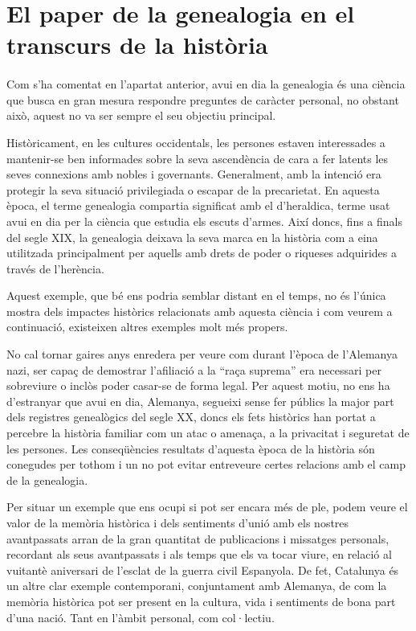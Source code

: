 \section{El paper de la genealogia en el transcurs de la història}

    \paragraph{}
    Com s’ha comentat en l'apartat anterior, avui en dia la genealogia és una ciència que busca en gran mesura respondre preguntes de caràcter personal, no obstant això, aquest no va ser sempre el seu objectiu principal.

    Històricament, en les cultures occidentals, les persones estaven interessades a mantenir-se ben informades sobre la seva ascendència de cara a fer latents les seves connexions amb nobles i governants. Generalment, amb la intenció era protegir la seva situació privilegiada o escapar de la precarietat. En aquesta època, el terme genealogia compartia significat amb el d'\gls{heraldica}, terme usat avui en dia per la ciència que estudia els escuts d’armes. Així doncs, fins a finals del segle XIX, la genealogia deixava la seva marca en la història com a eina utilitzada principalment per aquells amb drets de poder o riqueses adquirides a través de l’herència.

    Aquest exemple, que bé ens podria semblar distant en el temps, no és l’única mostra dels impactes històrics relacionats amb aquesta ciència i com veurem a continuació, existeixen altres exemples molt més propers.

    No cal tornar gaires anys enredera per veure com durant l’època de l’Alemanya nazi, ser capaç de demostrar l’afiliació a la ``raça suprema'' era necessari per sobreviure o inclòs poder casar-se de forma legal. Per aquest motiu, no ens ha d’estranyar que avui en dia, Alemanya, segueixi sense fer públics la major part dels registres genealògics del segle XX, doncs els fets històrics han portat a percebre la història familiar com un atac o amenaça, a la privacitat i seguretat de les persones. Les conseqüències resultats d'aquesta època de la història són conegudes per tothom i un no pot evitar entreveure certes relacions amb el camp de la genealogia.

    Per situar un exemple que ens ocupi si pot ser encara més de ple, podem veure el valor de la memòria històrica i dels sentiments d’unió amb els nostres avantpassats arran de la gran quantitat de publicacions i missatges personals, recordant als seus avantpassats i als temps que els va tocar viure, en relació al vuitantè aniversari de l'esclat de la guerra civil Espanyola. De fet, Catalunya és un altre clar exemple contemporani, conjuntament amb Alemanya, de com la memòria històrica pot ser present en la cultura, vida i sentiments de bona part d’una nació. Tant en l’àmbit personal, com col·lectiu.

